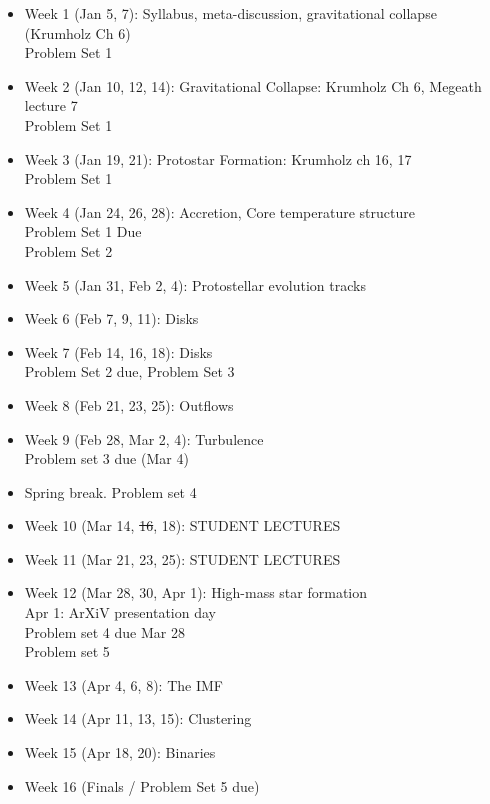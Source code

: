\documentclass[11pt]{article}
\begin{document}
\begin{itemize}
    \item Week 1 (Jan 5, 7): Syllabus, meta-discussion, gravitational collapse (Krumholz Ch 6) \\
        Problem Set 1
    \item Week 2 (Jan 10, 12, 14): Gravitational Collapse: Krumholz Ch 6, Megeath lecture 7 \\
        Problem Set 1
    \item Week 3 (Jan 19, 21): Protostar Formation: Krumholz ch 16, 17 \\
        Problem Set 1
    \item Week 4 (Jan 24, 26, 28):  Accretion, Core temperature structure \\
        Problem Set 1 Due \\
        Problem Set 2
    \item Week 5 (Jan 31, Feb 2, 4): Protostellar evolution tracks \\
    \item Week 6 (Feb 7, 9, 11): Disks \\
    \item Week 7 (Feb 14, 16, 18): Disks \\
        Problem Set 2 due, Problem Set 3
    \item Week 8 (Feb 21, 23, 25): Outflows \\
    \item Week 9 (Feb 28, Mar 2, 4): Turbulence \\
        Problem set 3 due (Mar 4)
    \item Spring break.
        Problem set 4 
    \item Week 10 (Mar 14, \sout{16}, 18): STUDENT LECTURES \\
    \item Week 11 (Mar 21, 23, 25): STUDENT LECTURES \\
    \item Week 12 (Mar 28, 30, Apr 1):  High-mass star formation \\
        Apr 1: ArXiV presentation day \\
        Problem set 4 due Mar 28 \\
        Problem set 5 \\
    \item Week 13 (Apr 4, 6, 8): The IMF \\
    \item Week 14 (Apr 11, 13, 15): Clustering \\
    \item Week 15 (Apr 18, 20):  Binaries\\
    \item Week 16 (Finals / Problem Set 5 due)
\end{itemize}
\end{document}
